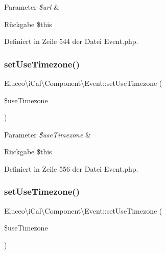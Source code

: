 \begin{DoxyParams}{Parameter}
{\em \$url} & \\
\hline
\end{DoxyParams}
\begin{DoxyReturn}{Rückgabe}
\$this 
\end{DoxyReturn}


Definiert in Zeile 544 der Datei Event.\+php.

\mbox{\label{class_eluceo_1_1i_cal_1_1_component_1_1_event_a73e24367751af65fcda2366c9df77409}} 
\subsubsection{\texorpdfstring{set\+Use\+Timezone()}{setUseTimezone()}\hspace{0.1cm}{\footnotesize\ttfamily [1/3]}}
{\footnotesize\ttfamily Eluceo\textbackslash{}i\+Cal\textbackslash{}\+Component\textbackslash{}\+Event\+::set\+Use\+Timezone (\begin{DoxyParamCaption}\item[{}]{\$use\+Timezone }\end{DoxyParamCaption})}


\begin{DoxyParams}{Parameter}
{\em \$use\+Timezone} & \\
\hline
\end{DoxyParams}
\begin{DoxyReturn}{Rückgabe}
\$this 
\end{DoxyReturn}


Definiert in Zeile 556 der Datei Event.\+php.

\mbox{\label{class_eluceo_1_1i_cal_1_1_component_1_1_event_a73e24367751af65fcda2366c9df77409}} 
\subsubsection{\texorpdfstring{set\+Use\+Timezone()}{setUseTimezone()}\hspace{0.1cm}{\footnotesize\ttfamily [2/3]}}
{\footnotesize\ttfamily Eluceo\textbackslash{}i\+Cal\textbackslash{}\+Component\textbackslash{}\+Event\+::set\+Use\+Timezone (\begin{DoxyParamCaption}\item[{}]{\$use\+Timezone }\end{DoxyParamCaption})}


